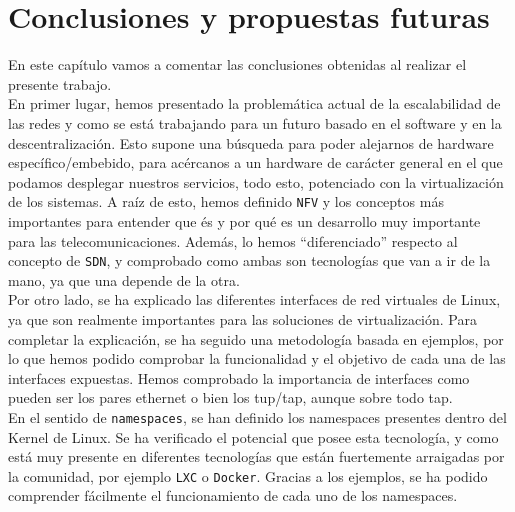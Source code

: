 \documentclass[a4paper, oneside, 12pt]{book}
\begin{document}
	
	\pagebreak
	
	\chapter{Conclusiones y propuestas futuras}
	
	\noindent En este capítulo vamos a comentar las conclusiones obtenidas al realizar el presente trabajo. \\
	
	\noindent En primer lugar, hemos presentado la problemática actual de la escalabilidad de las redes y como se está trabajando para un futuro basado en el software y en la descentralización. Esto supone una búsqueda para poder alejarnos de hardware específico/embebido, para acércanos a un hardware de carácter general en el que podamos desplegar nuestros servicios, todo esto, potenciado con la virtualización de los sistemas. A raíz de esto, hemos definido \texttt{NFV} y los conceptos más importantes para entender que és y por qué es un desarrollo muy importante para las telecomunicaciones. Además, lo hemos ``diferenciado'' respecto al concepto de \texttt{SDN}, y comprobado como ambas son tecnologías que van a ir de la mano, ya que una depende de la otra. \\
	
	\noindent Por otro lado, se ha explicado las diferentes interfaces de red virtuales de Linux, ya que son realmente importantes para las soluciones de virtualización. Para completar la explicación, se ha seguido una metodología basada en ejemplos, por lo que hemos podido comprobar la funcionalidad y el objetivo de cada una de las interfaces expuestas. Hemos comprobado la importancia de interfaces como pueden ser los pares ethernet o bien los tup/tap, aunque sobre todo tap. \\
	
	\noindent En el sentido de \texttt{namespaces}, se han definido los namespaces presentes dentro del Kernel de Linux. Se ha verificado el potencial que posee esta tecnología, y como está muy presente en diferentes tecnologías que están fuertemente arraigadas por la comunidad, por ejemplo \texttt{LXC} o \texttt{Docker}. Gracias a los ejemplos, se ha podido comprender fácilmente el funcionamiento de cada uno de los namespaces. \\
	
\end{document}
